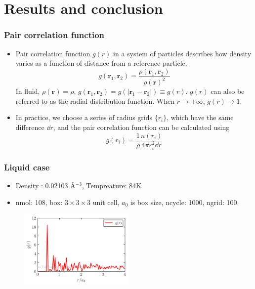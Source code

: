 \documentclass[10pt,t]{beamer}
\begin{document}
\section{Results and conclusion}
\begin{frame}
    \frametitle{Pair correlation function}
    \begin{itemize}
    \vspace{-0.6em}
    \setlength\itemsep{1em}
        \item Pair correlation function $g(r)$ in a system of particles describes how density varies as a function of distance from a reference particle.
        \begin{equation*} g(\mathbf{r}_1,\mathbf{r}_2)=\frac{\rho(\mathbf{r}_1,\mathbf{r}_2)}{\rho(\mathbf{r})^2}
        \end{equation*}
        In fluid, $\rho(\mathbf{r})=\rho$, $g(\mathbf{r}_1,\mathbf{r}_2)=g(|\mathbf{r}_1-\mathbf{r}_2|)\equiv g(r)$. $g(r)$ can also be referred to as the radial distribution function. When $r \to +\infty$, $g(r) \to 1$.
        \item In practice, we choose a series of radius grids $\{r_i\}$, which have the same difference $\dd r$, and the pair correlation function can be calculated using
        \begin{equation*} 
        g(r_i)=\frac{1}{\rho}\frac{n(r_i)}{4 \pi r_i^2 \dd r}
        \end{equation*}
    \end{itemize}
\end{frame}

\begin{frame}
    \frametitle{Liquid case}
    \begin{itemize}
    \vspace{-0.6em}
    \setlength\itemsep{1em}
        \item Density : 0.02103 \AA$^{-3}$, Tempreature: 84K
        \item nmol: 108, box: $3 \times 3 \times 3$ unit cell, $a_0$ is box size, ncycle: 1000, ngrid: 100.
    \end{itemize}
    \begin{figure} %
        \centering
        \includegraphics[width=0.5\textwidth]{figures/Ar_84K_333.png} 
    \end{figure}
\end{frame}
\end{document}

